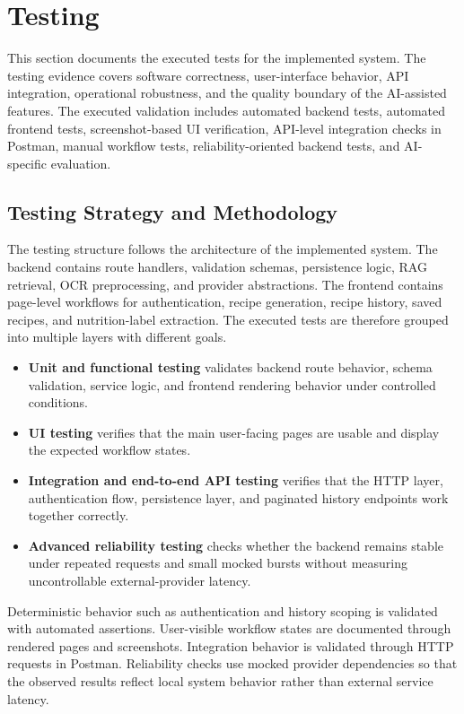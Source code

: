 \section{Testing}
\label{ch:testing}

This section documents the executed tests for the implemented system.
The testing evidence covers software correctness, user-interface
behavior, API integration, operational robustness, and the quality
boundary of the AI-assisted features. The executed validation includes
automated backend tests, automated frontend tests, screenshot-based UI
verification, API-level integration checks in Postman, manual workflow
tests, reliability-oriented backend tests, and AI-specific evaluation.

\subsection{Testing Strategy and Methodology}

The testing structure follows the architecture of the implemented
system. The backend contains route handlers, validation schemas,
persistence logic, RAG retrieval, OCR preprocessing, and provider
abstractions. The frontend contains page-level workflows for
authentication, recipe generation, recipe history, saved recipes, and
nutrition-label extraction. The executed tests are therefore grouped
into multiple layers with different goals.

\begin{itemize}
	\item \textbf{Unit and functional testing} validates backend route
	behavior, schema validation, service logic, and frontend rendering
	behavior under controlled conditions.
	\item \textbf{UI testing} verifies that the main user-facing pages are
	usable and display the expected workflow states.
	\item \textbf{Integration and end-to-end API testing} verifies that the
	HTTP layer, authentication flow, persistence layer, and paginated
	history endpoints work together correctly.
	\item \textbf{Advanced reliability testing} checks whether the backend
	remains stable under repeated requests and small mocked bursts without
	measuring uncontrollable external-provider latency.
\end{itemize}

Deterministic behavior such as authentication and history scoping is
validated with automated assertions. User-visible workflow states are
documented through rendered pages and screenshots. Integration behavior
is validated through HTTP requests in Postman. Reliability checks use
mocked provider dependencies so that the observed results reflect local
system behavior rather than external service latency.

